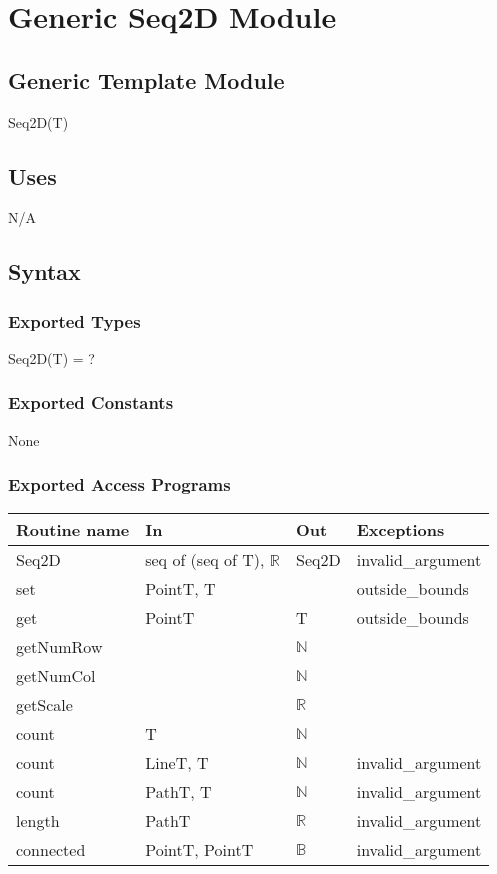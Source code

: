 \documentclass[12pt]{article}
\begin{document}
\section* {Generic Seq2D Module}

\subsection* {Generic Template Module}

Seq2D(T)

\subsection* {Uses}

N/A

\subsection* {Syntax}

\subsubsection* {Exported Types}

Seq2D(T) = ?

\subsubsection* {Exported Constants}

None

\subsubsection* {Exported Access Programs}

\begin{tabular}{| l | l | l | p{5cm} |}
\hline
\textbf{Routine name} & \textbf{In} & \textbf{Out} & \textbf{Exceptions}\\
\hline
Seq2D & seq of (seq of T), $\mathbb{R}$ & Seq2D & invalid\_argument\\
\hline
set & PointT, T & ~ & outside\_bounds\\
\hline
get & PointT & T & outside\_bounds\\
\hline
getNumRow & ~ & $\mathbb{N}$ & \\
\hline
getNumCol & ~ & $\mathbb{N}$ & \\
\hline
getScale & ~ & $\mathbb{R}$ & \\
\hline
count & T & $\mathbb{N}$ & \\
\hline
count & LineT, T & $\mathbb{N}$ & invalid\_argument\\
\hline
count & PathT, T & $\mathbb{N}$ & invalid\_argument\\
\hline
length & PathT & $\mathbb{R}$ & invalid\_argument\\
\hline
connected & PointT, PointT & $\mathbb{B}$ & invalid\_argument\\
\hline
\end{tabular}
\end{document}
